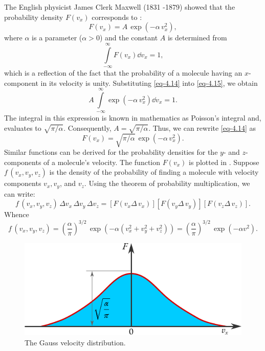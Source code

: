 The English physicist James Clerk Maxwell (1831 -1879) showed that
the	probability	density	 $F  (v_{x})$ corresponds	to :
\begin{equation}%
F (v_{x}) = A \, \exp (- \alpha \, v_{x}^{2}),
\label{eq-4.14}
\end{equation}
where $\alpha$ is a parameter ($\alpha > 0$) and the constant $A$ is determined from
\begin{equation}%
\int\limits_{- \infty}^{\infty} F (v_{x}) \dd v_{x} = 1,
\label{eq-4.15}
\end{equation}
which is a reflection of the fact that the probability of a molecule having
an $x$-component in its velocity is unity. Substituting \eqref{eq-4.14} into \eqref{eq-4.15}, we obtain
\begin{equation*}%
A \, \int\limits_{- \infty}^{\infty} \exp (- \alpha \, v_{x}^{2}) \dd v_{x} = 1.
\label{gauss-law-param}
\end{equation*}
The integral in this expression is known in mathematics as Poisson's integral and, evaluates to $\sqrt{\pi / \alpha}$. Consequently, $ A = \sqrt{\pi / \alpha}$. Thus, we can rewrite \eqref{eq-4.14} as 
\begin{equation}%
F (v_{x})  = \sqrt{\pi / \alpha} \, \exp (- \alpha \, v_{x}^{2}).
\label{eq-4.16}
\end{equation}
Similar functions can be derived for the probability densities for the $y$- and $z$-components of a molecule's velocity. The function $F(v_{x} )$ is plotted in . Suppose $f \,(v_{x}, v_{y}, v_{z})$ is the density of the probability of finding a molecule with velocity components $v_{x}, v_{y}$, and $v_{z}$. Using the theorem of probability multiplication, we can write:
\begin{equation*}%
f \, (v_{x}, v_{y}, v_{z}) \, \Delta v_{x}\, \Delta  v_{y} \, \Delta v_{z} = [F(v_{x} \Delta \, v_{x})] [F(v_{y} \Delta \, v_{y})][F(v_{z} \Delta \, v_{z})].
\end{equation*}
Whence
\begin{equation}
f \, (v_{x}, v_{y}, v_{z}) = \left(\frac{\alpha}{\pi} \right) ^{3/2} \, \exp (- \alpha (v_{x}^{2}+ v_{y}^{2} + v_{z}^{2})) = \left(\frac{\alpha}{\pi} \right) ^{3/2} \, \exp(- \alpha v^{2}).
\label{eq-4.17}
\end{equation}

\begin{figure}[!ht]
\centering
\includegraphics[width=0.75\tfwidth]{figures/maxwl-dist1.pdf}
\caption{The Gauss velocity distribution.\label{gauss-dist}}
\end{figure}



